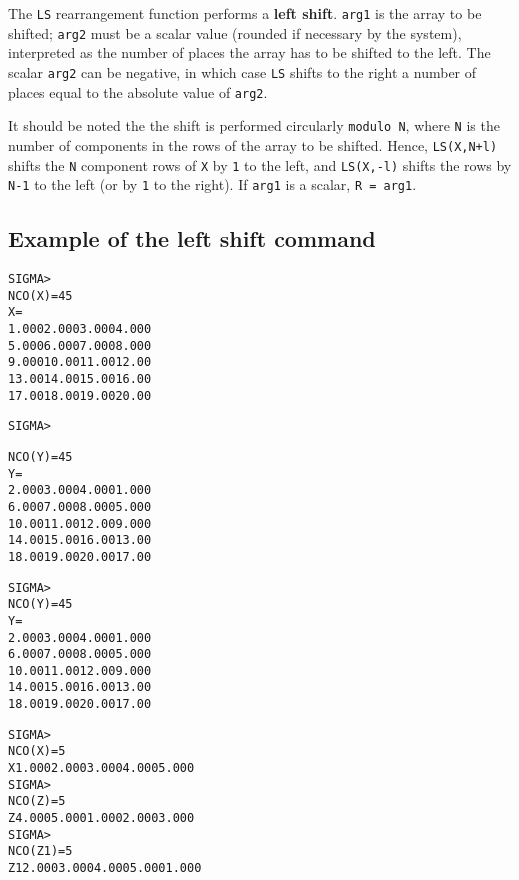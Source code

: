  
The \texttt{LS} rearrangement function performs a {\bf left shift}.
\texttt{arg1} is the array to be shifted; 
\texttt{arg2} must be a scalar value (rounded
if necessary by the system), 
interpreted as the number of places the array has to
be shifted to the left. 
The scalar \texttt{arg2} can be negative, in which case \texttt{LS} shifts
to the right a number of places equal to the absolute value of \texttt{arg2}.
 
It should be noted the the shift is performed circularly \texttt{modulo N},
where \texttt{N} 
is the number of components in the rows of the array to be shifted. 
Hence, \texttt{LS(X,N+l)}
shifts the \texttt{N} component rows of \texttt{X} by \texttt{1} to the left, 
and \texttt{LS(X,-l)} shifts the rows by
\texttt{N-1} to the left (or by \texttt{1} to the right).
If \texttt{arg1} is a scalar, \texttt{R = arg1}.

\subsection*{Example of the left shift command}
\begin{alltt}
 SIGMA > 
 NCO(X       )=    4    5
 X       =
   1.000      2.000      3.000      4.000
   5.000      6.000      7.000      8.000
   9.000      10.00      11.00      12.00
   13.00      14.00      15.00      16.00
   17.00      18.00      19.00      20.00
 
 SIGMA > 
 
 NCO(Y       )=    4    5
 Y       =
   2.000      3.000      4.000      1.000
   6.000      7.000      8.000      5.000
   10.00      11.00      12.00      9.000
   14.00      15.00      16.00      13.00
   18.00      19.00      20.00      17.00
 
 SIGMA > 
 NCO(Y       )=    4    5
 Y       =
   2.000      3.000      4.000      1.000
   6.000      7.000      8.000      5.000
   10.00      11.00      12.00      9.000
   14.00      15.00      16.00      13.00
   18.00      19.00      20.00      17.00
 
 SIGMA > 
 NCO(X       )=    5
 X         1.000      2.000      3.000      4.000      5.000
 SIGMA > 
 NCO(Z       )=    5
 Z         4.000      5.000      1.000      2.000      3.000
 SIGMA > 
 NCO(Z1      )=    5
 Z1        2.000      3.000      4.000      5.000      1.000
\end{alltt}

